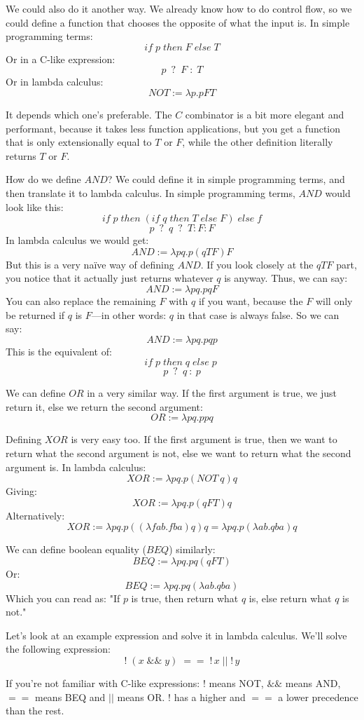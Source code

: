 \documentclass[11pt]{article}
\begin{document}
We could also do it another way. We already know how to do control flow, so we
could define a function that chooses the opposite of what the input is. In
simple programming terms:
\[if\;p\;then\;F\;else\;T\]
Or in a C-like expression:
\[p\enspace ?\enspace F\;:\;T\]
Or in lambda calculus:
\[NOT:=\lambda p.pFT\]

It depends which one's preferable. The \(C\) combinator is a bit more elegant
and performant, because it takes less function applications, but you get a
function that is only extensionally equal to \(T\) or \(F\), while the other
definition literally returns \(T\) or \(F\).

How do we define \(AND\)? We could define it in simple programming terms, and
then translate it to lambda calculus. In simple programming terms, \(AND\)
would look like this:
\[if\;p\;then\;(if\;q\;then\;T\;else\;F)\;else\;f\]
\[p\enspace ?\enspace q\enspace ?\enspace T:F:F\]
In lambda calculus we would get:
\[AND:=\lambda pq.p(qTF)F\]
But this is a very naïve way of defining \(AND\). If you look closely at the
\(qTF\) part, you notice that it actually just returns whatever \(q\) is
anyway. Thus, we can say:
\[AND:=\lambda pq.pqF\]
You can also replace the remaining \(F\) with \(q\) if you want, because the
\(F\) will only be returned if \(q\) is \(F\)---in other words: \(q\) in that
case is always false. So we can say:
\[AND:=\lambda pq.pqp\]
This is the equivalent of:
\[if\; p\; then\; q\; else\; p\;\]
\[p\enspace ?\enspace q\::\:p\]

We can define \(OR\) in a very similar way. If the first argument is true, we
just return it, else we return the second argument:
\[OR:=\lambda pq.ppq\]

Defining \(XOR\) is very easy too. If the first argument is true, then we want
to return what the second argument is not, else we want to return what the
second argument is. In lambda calculus:
\[XOR:=\lambda pq.p(NOT\:q)q\]
Giving:
\[XOR:=\lambda pq.p(qFT)q\]
Alternatively:
\[XOR:=\lambda pq.p((\lambda fab.fba)q)q=\lambda pq.p(\lambda ab.qba)q\]

We can define boolean equality (\(BEQ\)) similarly:
\[BEQ:=\lambda pq.pq(qFT)\]
Or:
\[BEQ:=\lambda pq.pq(\lambda ab.qba)\]
Which you can read as: "If \(p\) is true, then return what \(q\) is, else
return what \(q\) is not."

Let's look at an example expression and solve it in lambda calculus. We'll
solve the following expression:
\[!\;(x\;\&\&\;y)\;==\;!\,x\;||\;!\,y\]

If you're not familiar with C-like expressions: \(!\) means NOT, \(\&\&\) means
AND, \(==\) means BEQ and \(||\) means OR. \(!\) has a higher and \(==\) a
lower precedence than the rest.
\end{document}
